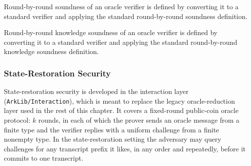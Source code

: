\begin{definition}
    \label{def:oracle_verifier_rbr_soundness}
    Round-by-round soundness of an oracle verifier is defined by converting it to a standard verifier
    and applying the standard round-by-round soundness definition.
    \leanok
\end{definition}

\begin{definition}
    \label{def:oracle_verifier_rbr_knowledge_soundness}
    Round-by-round knowledge soundness of an oracle verifier is defined by converting it to a standard
    verifier and applying the standard round-by-round knowledge soundness definition.
    \leanok
\end{definition}

\subsubsection{State-Restoration Security}\label{sec:state_restoration_security}

State-restoration security is developed in the interaction layer (\texttt{ArkLib/Interaction}),
which is meant to replace the legacy oracle-reduction layer used in the rest of this chapter. It
covers a fixed-round public-coin oracle protocol: \(k\) rounds, in each
of which the prover sends an oracle message from a finite type and the verifier replies with a
uniform challenge from a finite nonempty type. In the state-restoration setting the adversary may
query challenges for any transcript prefix it likes, in any order and repeatedly, before it
commits to one transcript.

